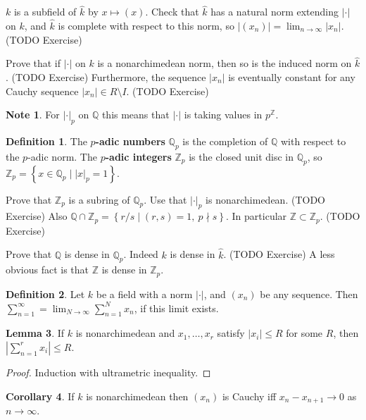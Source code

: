 \documentclass{article}
\newcommand{\Z}{\mathbb{Z}}
\newcommand{\Q}{\mathbb{Q}}
\newcommand{\rb}[1]{\left( #1 \right)}
\newcommand{\cb}[1]{\left\{ #1 \right\}}
\newcommand{\abs}[1]{\left\lvert #1 \right\rvert}
\theoremstyle{definition}\newtheorem{definition}{Definition}[section]
\theoremstyle{definition}\newtheorem{remark}[definition]{Remark}
\theoremstyle{definition}\newtheorem*{example}{Example}
\theoremstyle{definition}\newtheorem*{note}{Note}
\newtheorem{lemma}[definition]{Lemma}
\newtheorem{corollary}[definition]{Corollary}
\begin{document}
$ k $ is a subfield of $ \widehat{k} $ by $ x \mapsto \rb{x} $. Check that $ \widehat{k} $ has a natural norm extending $ \abs{\cdot} $ on $ k $, and $ \widehat{k} $ is complete with respect to this norm, so $ \abs{\rb{x_n}} = \lim_{n \to \infty} \abs{x_n} $. (TODO Exercise)

Prove that if $ \abs{\cdot} $ on $ k $ is a nonarchimedean norm, then so is the induced norm on $ \widehat{k} $. (TODO Exercise) Furthermore, the sequence $ \abs{x_n} $ is eventually constant for any Cauchy sequence $ \abs{x_n} \in R \setminus I $. (TODO Exercise)

\begin{note}
For $ \abs{\cdot}_p $ on $ \Q $ this means that $ \abs{\cdot} $ is taking values in $ p^{\Z} $.
\end{note}

\begin{definition}
The \textbf{$ p $-adic numbers} $ \Q_p $ is the completion of $ \Q $ with respect to the $ p $-adic norm. The \textbf{$ p $-adic integers} $ \Z_p $ is the closed unit disc in $ \Q_p $, so $ \Z_p = \cb{x \in \Q_p \mid \abs{x}_p = 1} $.
\end{definition}

Prove that $ \Z_p $ is a subring of $ \Q_p $. Use that $ \abs{\cdot}_p $ is nonarchimedean. (TODO Exercise) Also $ \Q \cap \Z_p = \cb{r / s \mid \rb{r, s} = 1, \ p \nmid s} $. In particular $ \Z \subset \Z_p $. (TODO Exercise)

Prove that $ \Q $ is dense in $ \Q_p $. Indeed $ k $ is dense in $ \widehat{k} $. (TODO Exercise) A less obvious fact is that $ \Z $ is dense in $ \Z_p $.

\begin{definition}
Let $ k $ be a field with a norm $ \abs{\cdot} $, and $ \rb{x_n} $ be any sequence. Then $ \sum_{n = 1}^\infty = \lim_{N \to \infty} \sum_{n = 1}^N x_n $, if this limit exists.
\end{definition}

\begin{lemma}
\label{lem:1.10}
If $ k $ is nonarchimedean and $ x_1, \dots, x_r $ satisfy $ \abs{x_i} \le R $ for some $ R $, then $ \abs{\sum_{n = 1}^r x_i} \le R $.
\end{lemma}

\begin{proof}
Induction with ultrametric inequality.
\end{proof}

\begin{corollary}
\label{cor:1.11}
If $ k $ is nonarchimedean then $ \rb{x_n} $ is Cauchy iff $ x_n - x_{n + 1} \to 0 $ as $ n \to \infty $.
\end{corollary}
\end{document}
